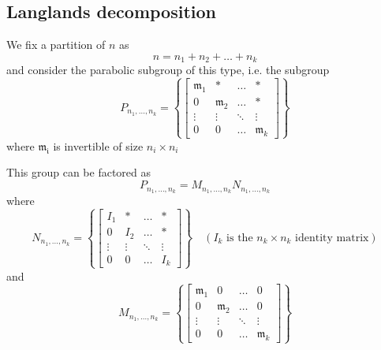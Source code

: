 \subsection{Langlands decomposition}
We fix a partition of $n$ as
\[n=n_1+n_2+\ldots+n_k\]
and consider the parabolic subgroup of this type, i.e. the subgroup
\[P_{n_1,\ldots, n_k} = \left\lbrace \begin{bmatrix}
        \mathfrak{m}_1 & \ast           & \ldots & \ast           \\
        0              & \mathfrak{m}_2 & \ldots & \ast           \\
        \vdots         & \vdots         & \ddots & \vdots         \\
        0              & 0              & \ldots & \mathfrak{m}_k
    \end{bmatrix} \right\rbrace\]
where $\mathfrak{m_i}$ is invertible of size $n_i \times n_i$

This group can be factored as
\[P_{n_1,\ldots, n_k} =M_{n_1,\ldots, n_k}N_{n_1,\ldots, n_k}\]
where
\[N_{n_1,\ldots, n_k} = \left\lbrace \begin{bmatrix}
        I_1    & \ast   & \ldots & \ast   \\
        0      & I_2    & \ldots & \ast   \\
        \vdots & \vdots & \ddots & \vdots \\
        0      & 0      & \ldots & I_k
    \end{bmatrix} \right\rbrace \quad \left(I_k \text{ is the $n_k\times n_k$ identity matrix}\right)\]
and
\[M_{n_1,\ldots, n_k} = \left\lbrace \begin{bmatrix}
        \mathfrak{m}_1 & 0              & \ldots & 0              \\
        0              & \mathfrak{m}_2 & \ldots & 0              \\
        \vdots         & \vdots         & \ddots & \vdots         \\
        0              & 0              & \ldots & \mathfrak{m}_k
    \end{bmatrix} \right\rbrace\]

